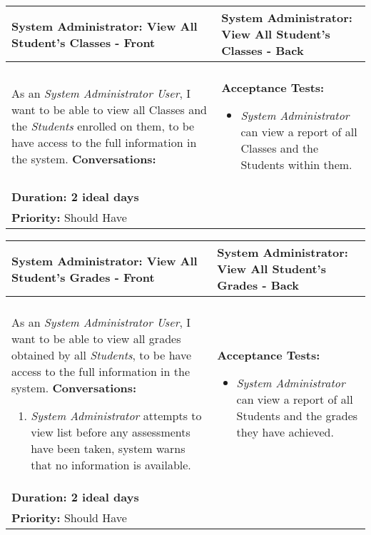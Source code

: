\documentclass[11pt]{article}
\begin{document}
\begin{center}
\begin{tabular}{ | m{8cm}  |  m{8cm}  | } 
 \hline
 \textbf{System Administrator: View All Student's Classes - Front} &  \textbf{System Administrator: View All Student's Classes - Back}  \\ 
  \hline
&\\[5pt]
As an \emph{System Administrator User}, I want to be able to view all Classes and the \emph{Students} enrolled on them, to be have access to the full information in the system.  \newline
\textbf{Conversations:}
& \textbf{Acceptance Tests:} 
\begin{itemize}
\item{\emph{System Administrator} can view a report of all Classes and the Students within them.}
\end{itemize} \\
\textbf{Duration: 2 ideal days} &\\
\textbf{Priority:}  \textcolor{mauve}{Should Have} & \\
 \hline
\end{tabular}
\end{center}

\begin{center}
\begin{tabular}{ | m{8cm}  |  m{8cm}  | } 
 \hline
 \textbf{System Administrator: View All Student's Grades - Front} &  \textbf{System Administrator: View All Student's Grades - Back}  \\ 
  \hline
&\\[5pt]
As an \emph{System Administrator User}, I want to be able to view all grades obtained by all \emph{Students}, to be have access to the full information in the system.  \newline
\textbf{Conversations:}
\begin{enumerate}
\item{\emph{System Administrator} attempts to view list before any assessments have been taken, system warns that no information is available.}
\end{enumerate}
& \textbf{Acceptance Tests:} 
\begin{itemize}
\item{\emph{System Administrator} can view a report of all Students and the grades they have achieved.}
\end{itemize} \\
\textbf{Duration: 2 ideal days} &\\
\textbf{Priority:}  \textcolor{mauve}{Should Have} & \\
 \hline
\end{tabular}
\end{center}
\end{document}

